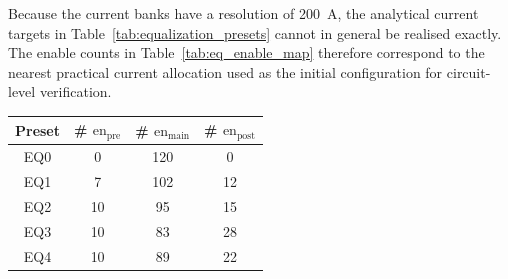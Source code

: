 Because the current banks have a resolution of 200~\textmu A, the analytical current targets in Table~\ref{tab:equalization_presets} cannot in general be realised exactly. The enable counts in Table~\ref{tab:eq_enable_map} therefore correspond to the nearest practical current allocation used as the initial configuration for circuit-level verification.

\begin{center}
	\label{tab:eq_enable_map}
	\begin{tabular}{cccc}
		\hline \hline	
		\textbf{Preset} & \textbf{\# $\mathrm{en_{pre}}$} & \textbf{\# $\mathrm{en_{main}}$} & \textbf{\# $\mathrm{en_{post}}$} \\
		\hline
		EQ0 & 0 & 120 & 0 \\
		EQ1 & 7 & 102 & 12 \\
		EQ2 & 10 & 95 & 15 \\
		EQ3 & 10 & 83 & 28 \\
		EQ4 & 10 & 89 & 22 \\
		\hline \hline
	\end{tabular}
\end{center}

